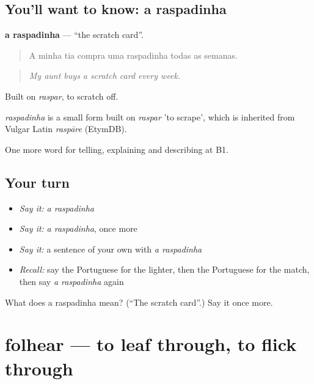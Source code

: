 \subsection*{You'll want to know: a raspadinha}
\textbf{a raspadinha} — \textquotedblleft{}the scratch card\textquotedblright{}.

\begin{quote}
A minha tia compra uma raspadinha todas as semanas.
\end{quote}

\begin{quote}
\emph{My aunt buys a scratch card every week.}
\end{quote}

Built on \emph{raspar}, to scratch off.

\begin{cousinweb}
\emph{raspadinha} is a small form built on \emph{raspar} 'to scrape', which is inherited from Vulgar Latin \emph{raspāre} (EtymDB).
\end{cousinweb}

\begin{grammarlens}[title={What you've built}]
One more word for telling, explaining and describing at B1.
\end{grammarlens}

\subsection*{Your turn}
\begin{itemize}
\raggedright
  \item \emph{Say it:} \emph{a raspadinha}
  \item \emph{Say it:} \emph{a raspadinha}, once more
  \item \emph{Say it:} a sentence of your own with \emph{a raspadinha}
  \item \emph{Recall:} say the Portuguese for the lighter, then the Portuguese for the match, then say \emph{a raspadinha} again
\end{itemize}

\begin{tcolorbox}[breakable,colback=teal!4,colframe=teal!35!black,title={Before you move on}]
What does a raspadinha mean? (\textquotedblleft{}The scratch card\textquotedblright{}.) Say it once more.
\end{tcolorbox}
\section[folhear]{folhear — to leaf through, to flick through}


